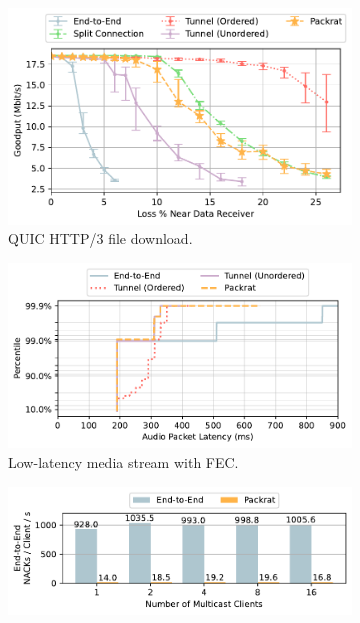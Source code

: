 \begin{figure}[t]
    \centering
    \begin{subfigure}[b]{0.5\linewidth}
        \includegraphics[width=\linewidth]{packrat/figures/http_benchmark.pdf}
        \caption{QUIC HTTP/3 file download.}
        \label{fig:packrat:perf:http}
    \end{subfigure}
    \begin{subfigure}[b]{0.48\linewidth}
        \includegraphics[width=\linewidth]{packrat/figures/media_benchmark.pdf}
        \caption{Low-latency media stream with FEC.}
        \label{fig:packrat:perf:media}
    \end{subfigure}
    \begin{subfigure}[b]{0.48\linewidth}
        \includegraphics[width=\linewidth]{packrat/figures/multicast_benchmark.pdf}

\end{subfigure}
\end{figure}
